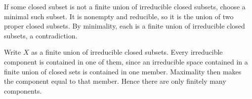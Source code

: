 If some closed subset is not a finite union of irreducible closed subsets, choose a minimal such subset. It is nonempty and reducible, so it is the union of two proper closed subsets. By minimality, each is a finite union of irreducible closed subsets, a contradiction.

Write $X$ as a finite union of irreducible closed subsets. Every irreducible component is contained in one of them, since an irreducible space contained in a finite union of closed sets is contained in one member. Maximality then makes the component equal to that member. Hence there are only finitely many components.
